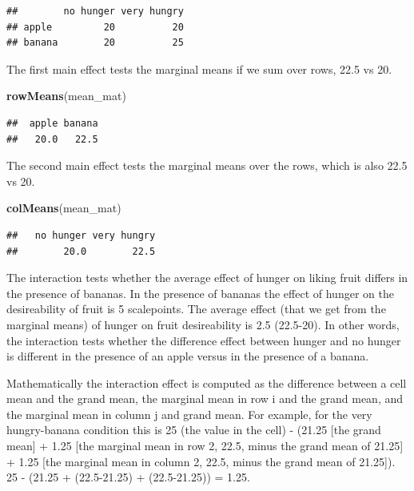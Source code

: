 \documentclass[]{book}
\newenvironment{Shaded}{\begin{snugshade}}{\end{snugshade}}
\newcommand{\KeywordTok}[1]{\textcolor[rgb]{0.13,0.29,0.53}{\textbf{#1}}}
\newcommand{\NormalTok}[1]{#1}
\begin{document}
\begin{verbatim}
##        no hunger very hungry
## apple         20          20
## banana        20          25
\end{verbatim}

The first main effect tests the marginal means if we sum over rows, 22.5 vs 20.

\begin{Shaded}
\begin{Highlighting}[]
\KeywordTok{rowMeans}\NormalTok{(mean_mat)}
\end{Highlighting}
\end{Shaded}

\begin{verbatim}
##  apple banana 
##   20.0   22.5
\end{verbatim}

The second main effect tests the marginal means over the rows, which is also 22.5 vs 20.

\begin{Shaded}
\begin{Highlighting}[]
\KeywordTok{colMeans}\NormalTok{(mean_mat)}
\end{Highlighting}
\end{Shaded}

\begin{verbatim}
##   no hunger very hungry 
##        20.0        22.5
\end{verbatim}

The interaction tests whether the average effect of hunger on liking fruit differs in the presence of bananas. In the presence of bananas the effect of hunger on the desireability of fruit is 5 scalepoints. The average effect (that we get from the marginal means) of hunger on fruit desireability is 2.5 (22.5-20). In other words, the interaction tests whether the difference effect between hunger and no hunger is different in the presence of an apple versus in the presence of a banana.

Mathematically the interaction effect is computed as the difference between a cell mean and the grand mean, the marginal mean in row i and the grand mean, and the marginal mean in column j and grand mean. For example, for the very hungry-banana condition this is 25 (the value in the cell) - (21.25 {[}the grand mean{]} + 1.25 {[}the marginal mean in row 2, 22.5, minus the grand mean of 21.25{]} + 1.25 {[}the marginal mean in column 2, 22.5, minus the grand mean of 21.25{]}). 25 - (21.25 + (22.5-21.25) + (22.5-21.25)) = 1.25.
\end{document}
